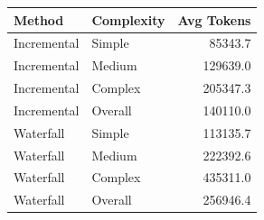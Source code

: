 \begin{tabular}{llr}
\toprule
Method & Complexity & Avg Tokens \\
\midrule
Incremental & Simple & 85343.7 \\
Incremental & Medium & 129639.0 \\
Incremental & Complex & 205347.3 \\
Incremental & Overall & 140110.0 \\
Waterfall & Simple & 113135.7 \\
Waterfall & Medium & 222392.6 \\
Waterfall & Complex & 435311.0 \\
Waterfall & Overall & 256946.4 \\
\bottomrule
\end{tabular}

